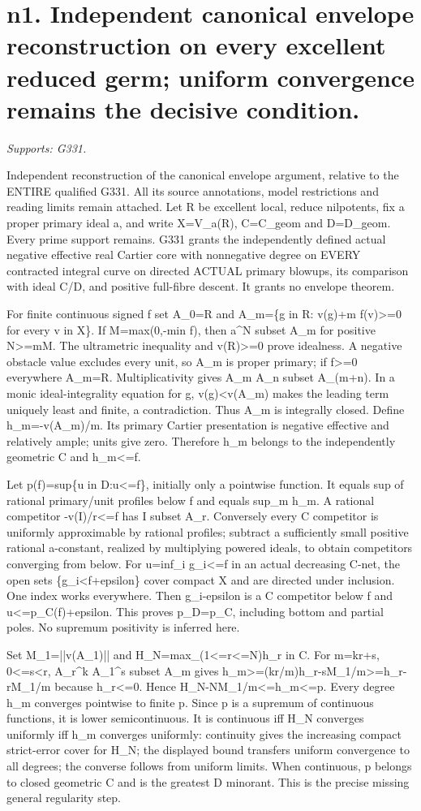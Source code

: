 \section{n1. Independent canonical envelope reconstruction on every excellent reduced germ; uniform convergence remains the decisive condition.}
\textit{Supports: G331.}

Independent reconstruction of the canonical envelope argument, relative to the ENTIRE qualified G331. All its source annotations, model restrictions and reading limits remain attached. Let R be excellent local, reduce nilpotents, fix a proper primary ideal a, and write X=V\_a(R), C=C\_geom and D=D\_geom. Every prime support remains. G331 grants the independently defined actual negative effective real Cartier core with nonnegative degree on EVERY contracted integral curve on directed ACTUAL primary blowups, its comparison with ideal C/D, and positive full-fibre descent. It grants no envelope theorem.

For finite continuous signed f set A\_0=R and A\_m=\{g in R: v(g)+m f(v)>=0 for every v in X\}. If M=max(0,-min f), then a\textasciicircum{}N subset A\_m for positive N>=mM. The ultrametric inequality and v(R)>=0 prove idealness. A negative obstacle value excludes every unit, so A\_m is proper primary; if f>=0 everywhere A\_m=R. Multiplicativity gives A\_m A\_n subset A\_(m+n). In a monic ideal-integrality equation for g, v(g)<v(A\_m) makes the leading term uniquely least and finite, a contradiction. Thus A\_m is integrally closed. Define h\_m=-v(A\_m)/m. Its primary Cartier presentation is negative effective and relatively ample; units give zero. Therefore h\_m belongs to the independently geometric C and h\_m<=f.

Let p(f)=sup\{u in D:u<=f\}, initially only a pointwise function. It equals sup of rational primary/unit profiles below f and equals sup\_m h\_m. A rational competitor -v(I)/r<=f has I subset A\_r. Conversely every C competitor is uniformly approximable by rational profiles; subtract a sufficiently small positive rational a-constant, realized by multiplying powered ideals, to obtain competitors converging from below. For u=inf\_i g\_i<=f in an actual decreasing C-net, the open sets \{g\_i<f+epsilon\} cover compact X and are directed under inclusion. One index works everywhere. Then g\_i-epsilon is a C competitor below f and u<=p\_C(f)+epsilon. This proves p\_D=p\_C, including bottom and partial poles. No supremum positivity is inferred here.

Set M\_1=||v(A\_1)|| and H\_N=max\_(1<=r<=N)h\_r in C. For m=kr+s, 0<=s<r, A\_r\textasciicircum{}k A\_1\textasciicircum{}s subset A\_m gives h\_m>=(kr/m)h\_r-sM\_1/m>=h\_r-rM\_1/m because h\_r<=0. Hence H\_N-NM\_1/m<=h\_m<=p. Every degree h\_m converges pointwise to finite p. Since p is a supremum of continuous functions, it is lower semicontinuous. It is continuous iff H\_N converges uniformly iff h\_m converges uniformly: continuity gives the increasing compact strict-error cover for H\_N; the displayed bound transfers uniform convergence to all degrees; the converse follows from uniform limits. When continuous, p belongs to closed geometric C and is the greatest D minorant. This is the precise missing general regularity step.

